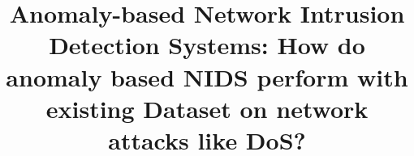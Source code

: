 \documentclass[conference]{IEEEtran}
\begin{document}
\title{Anomaly-based Network Intrusion Detection Systems: How do anomaly based NIDS perform with existing Dataset on network attacks like DoS?}

\author{
}

\maketitle



\end{document}
